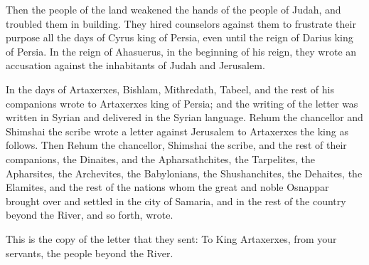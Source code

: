  Then the people of the land weakened the hands of the
people of Judah, and troubled them in building.  They
hired counselors against them to frustrate their purpose all the days of
Cyrus king of Persia, even until the reign of Darius king of Persia.
 In the reign of Ahasuerus, in the beginning of his reign,
they wrote an accusation against the inhabitants of Judah and Jerusalem.

 In the days of Artaxerxes, Bishlam, Mithredath, Tabeel,
and the rest of his companions wrote to Artaxerxes king of Persia; and
the writing of the letter was written in Syrian and delivered in the
Syrian language.  Rehum the chancellor and Shimshai the
scribe wrote a letter against Jerusalem to Artaxerxes the king as
follows.  Then Rehum the chancellor, Shimshai the scribe,
and the rest of their companions, the Dinaites, and the Apharsathchites,
the Tarpelites, the Apharsites, the Archevites, the Babylonians, the
Shushanchites, the Dehaites, the Elamites,  and the rest
of the nations whom the great and noble Osnappar brought over and
settled in the city of Samaria, and in the rest of the country beyond
the River, and so forth, wrote.

 This is the copy of the letter that they sent: To King
Artaxerxes, from your servants, the people beyond the River.

